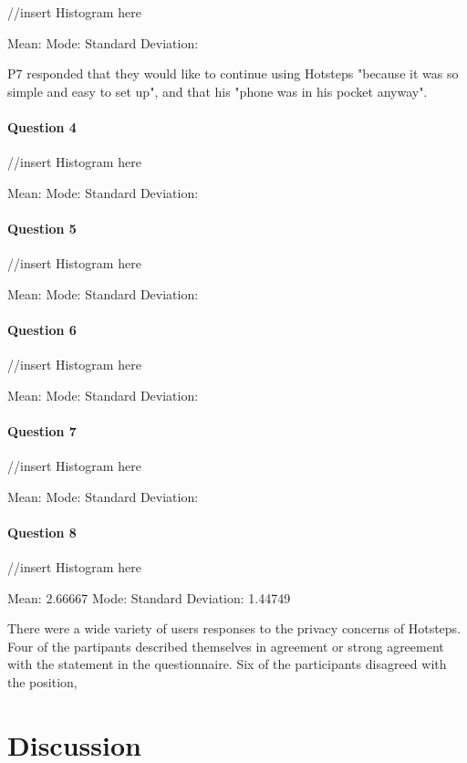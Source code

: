 \documentclass{l4proj}
\begin{document}
//insert Histogram here

Mean:
Mode:
Standard Deviation:

P7 responded that they would like to continue using Hotsteps "because it was so simple and easy to set up", and that his "phone was in his pocket anyway". 

\subsubsection{Question 4}

//insert Histogram here

Mean:
Mode:
Standard Deviation:

\subsubsection{Question 5}

//insert Histogram here

Mean:
Mode:
Standard Deviation:

\subsubsection{Question 6}

//insert Histogram here

Mean:
Mode:
Standard Deviation:

\subsubsection{Question 7}

//insert Histogram here

Mean:
Mode:
Standard Deviation:

\subsubsection{Question 8}

//insert Histogram here

Mean: 2.66667
Mode:
Standard Deviation: 1.44749

There were a wide variety of users responses to the privacy concerns of Hotsteps. Four of the partipants described themselves in agreement or strong agreement with the statement in the questionnaire. Six of the participants disagreed with the position, 


\chapter{Discussion}
\end{document}
